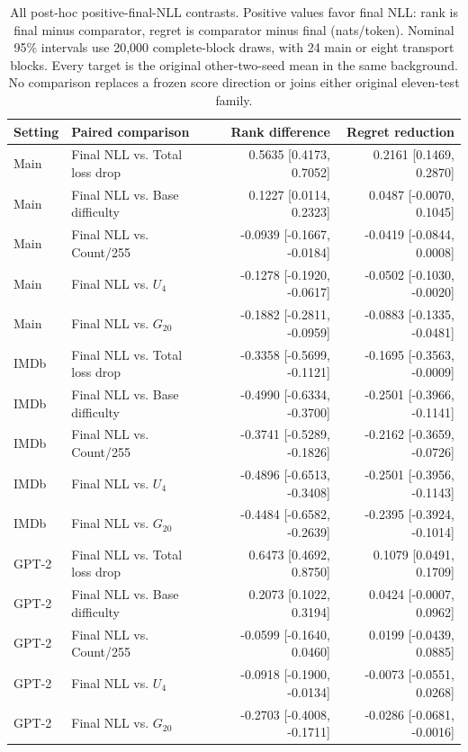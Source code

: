 \begin{table}[tp]
\centering
\footnotesize
\setlength{\tabcolsep}{3pt}
\begin{tabular}{llrr}
\toprule
Setting & Paired comparison & Rank difference & Regret reduction \\
\midrule
Main & Final NLL vs. Total loss drop & 0.5635 [0.4173, 0.7052] & 0.2161 [0.1469, 0.2870] \\
Main & Final NLL vs. Base difficulty & 0.1227 [0.0114, 0.2323] & 0.0487 [-0.0070, 0.1045] \\
Main & Final NLL vs. Count/255 & -0.0939 [-0.1667, -0.0184] & -0.0419 [-0.0844, 0.0008] \\
Main & Final NLL vs. $U_4$ & -0.1278 [-0.1920, -0.0617] & -0.0502 [-0.1030, -0.0020] \\
Main & Final NLL vs. $G_{20}$ & -0.1882 [-0.2811, -0.0959] & -0.0883 [-0.1335, -0.0481] \\
IMDb & Final NLL vs. Total loss drop & -0.3358 [-0.5699, -0.1121] & -0.1695 [-0.3563, -0.0009] \\
IMDb & Final NLL vs. Base difficulty & -0.4990 [-0.6334, -0.3700] & -0.2501 [-0.3966, -0.1141] \\
IMDb & Final NLL vs. Count/255 & -0.3741 [-0.5289, -0.1826] & -0.2162 [-0.3659, -0.0726] \\
IMDb & Final NLL vs. $U_4$ & -0.4896 [-0.6513, -0.3408] & -0.2501 [-0.3956, -0.1143] \\
IMDb & Final NLL vs. $G_{20}$ & -0.4484 [-0.6582, -0.2639] & -0.2395 [-0.3924, -0.1014] \\
GPT-2 & Final NLL vs. Total loss drop & 0.6473 [0.4692, 0.8750] & 0.1079 [0.0491, 0.1709] \\
GPT-2 & Final NLL vs. Base difficulty & 0.2073 [0.1022, 0.3194] & 0.0424 [-0.0007, 0.0962] \\
GPT-2 & Final NLL vs. Count/255 & -0.0599 [-0.1640, 0.0460] & 0.0199 [-0.0439, 0.0885] \\
GPT-2 & Final NLL vs. $U_4$ & -0.0918 [-0.1900, -0.0134] & -0.0073 [-0.0551, 0.0268] \\
GPT-2 & Final NLL vs. $G_{20}$ & -0.2703 [-0.4008, -0.1711] & -0.0286 [-0.0681, -0.0016] \\
\bottomrule
\end{tabular}
\caption{All post-hoc positive-final-NLL contrasts. Positive values favor final NLL: rank is final minus comparator, regret is comparator minus final (nats/token). Nominal 95\% intervals use 20,000 complete-block draws, with 24 main or eight transport blocks. Every target is the original other-two-seed mean in the same background. No comparison replaces a frozen score direction or joins either original eleven-test family.}
\label{tab:review_final}
\end{table}

